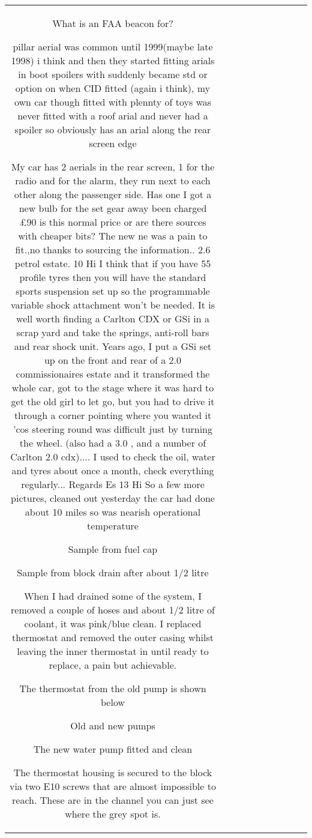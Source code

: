 \begin{table}[h!]
\begin{tabular}{|c|c|c|c|c|c|c|c|c|c|}
{What is an FAA beacon for?

pillar aerial was common until 1999(maybe late 1998) i think and then they started fitting arials in boot spoilers with suddenly became std or option on when CID fitted (again i think), my own car though fitted with plennty of toys was never fitted with a roof arial and never had a spoiler so obviously has an arial along the rear screen edge

My car has 2 aerials in the rear screen, 1 for the radio and for the alarm, they run next to each other along the passenger side.
Has one I got a new bulb for the set gear away been charged £90 is this normal price or are there sources with cheaper bits?
The new ne was a pain to fit.,no thanks to sourcing the information..
2.6 petrol estate.
10
Hi
I think that if you have 55 profile tyres then you will have the standard sports suspension set up so the programmable variable shock attachment won't be needed. It is well worth finding a Carlton CDX or GSi in a scrap yard and take the springs, anti-roll bars and rear shock unit. Years ago, I put a GSi set up on the front and rear of a 2.0 commissionaires estate and it transformed the whole car, got to the stage where it was hard to get the old girl to let go, but you had to drive it through a corner pointing where you wanted it 'cos steering round was difficult just by turning the wheel. (also had a 3.0 , and a number of Carlton 2.0 cdx)....
I used to check the oil, water and tyres about once a month, check everything regularly...
Regards
Es
13
Hi
So a few more pictures, cleaned out yesterday the car had done about 10 miles so was nearish operational temperature

Sample from fuel cap


Sample from block drain after about 1/2 litre


When I had drained some of the system, I removed a couple of hoses and about 1/2 litre of coolant, it was pink/blue clean.
I replaced thermostat and removed the outer casing whilst leaving the inner thermostat in until ready to replace, a pain but achievable.

The thermostat from the old pump is shown below


Old and new pumps


The new water pump fitted and clean



The thermostat housing is secured to the block via two E10 screws that are almost impossible to reach.
These are in the channel you can just see where the grey spot is.


}
\end{tabular}
\end{table}
